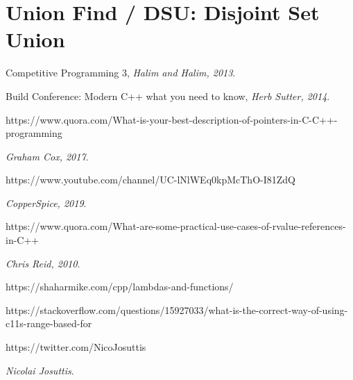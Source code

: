 \documentclass[12pt, fleqn]{report}                             %
\theoremstyle{break}                                            %
\begin{document}
        \section{Union Find / DSU: Disjoint Set Union}




\begin{thebibliography}{10}

        Competitive Programming 3,
        \textit{Halim and Halim, 2013}. 


        Build Conference: Modern C++ what you need to know,
        \textit{Herb Sutter, 2014}. 

        https://www.quora.com/What-is-your-best-description-of-pointers-in-C-C++-programming

        \textit{Graham Cox, 2017}. 

        https://www.youtube.com/channel/UC-lNlWEq0kpMcThO-I81ZdQ

        \textit{CopperSpice, 2019}. 

        https://www.quora.com/What-are-some-practical-use-cases-of-rvalue-references-in-C++

        \textit{Chris Reid, 2010}. 

        https://shaharmike.com/cpp/lambdas-and-functions/

        https://stackoverflow.com/questions/15927033/what-is-the-correct-way-of-using-c11s-range-based-for

        https://twitter.com/NicoJosuttis
        
        \textit{Nicolai Josuttis}. 


\end{thebibliography}
\end{document}
